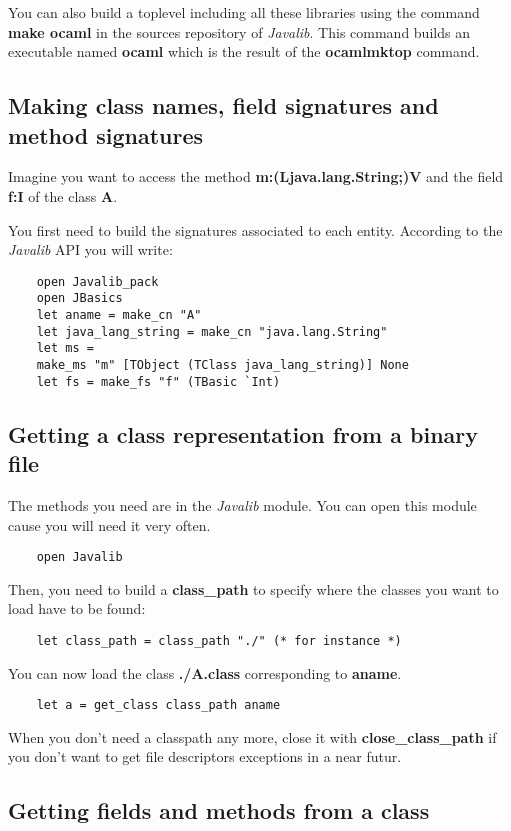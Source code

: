 \documentclass{article}
\begin{document}
You can also build a toplevel including all these libraries using
the command \textbf{make ocaml} in the sources repository of
\emph{Javalib}. This command builds an executable named
\textbf{ocaml} which is the result of the \textbf{ocamlmktop}
command.

\subsection{Making class names, field signatures and method signatures}

Imagine you want to access the method
\textbf{m:(Ljava.lang.String;)V} and the field \textbf{f:I} of the
class \textbf{A}.

You first need to build the signatures associated to each entity.
According to the \emph{Javalib} API you will write:

\begin{verbatim}
    open Javalib_pack
    open JBasics
    let aname = make_cn "A"
    let java_lang_string = make_cn "java.lang.String"
    let ms =
    make_ms "m" [TObject (TClass java_lang_string)] None
    let fs = make_fs "f" (TBasic `Int)
\end{verbatim}
\subsection{Getting a class representation from a binary file}

The methods you need are in the \emph{Javalib} module. You can open
this module cause you will need it very often.

\begin{verbatim}
    open Javalib
\end{verbatim}
Then, you need to build a \textbf{class\_path} to specify where the
classes you want to load have to be found:

\begin{verbatim}
    let class_path = class_path "./" (* for instance *)
\end{verbatim}
You can now load the class \textbf{./A.class} corresponding to
\textbf{aname}.

\begin{verbatim}
    let a = get_class class_path aname
\end{verbatim}
When you don't need a classpath any more, close it with
\textbf{close\_class\_path} if you don't want to get file
descriptors exceptions in a near futur.

\subsection{Getting fields and methods from a class}
\end{document}
